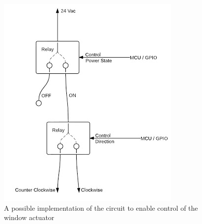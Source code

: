 \begin{itemize}
\begin{itemize}
					\begin{figure}[H]
						\centering
							\includegraphics[scale=0.60]{img/relay-circuit}
						\caption{A possible implementation of the circuit to enable control of the window actuator}
					\end{figure}

				\end{itemize}
			\end{itemize}
\newpage